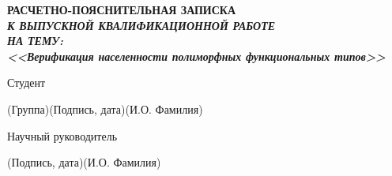 \documentclass[14pt, russian]{scrartcl}
\begin{document}
\sloppy
\setcounter{secnumdepth}{2}

\def\figurename{Рисунок}

\begin{titlepage}
\thispagestyle{empty}
\newpage

\bmstuheader
 
 
\vspace{3em}
 
\begin{center}
\Large \bf{РАСЧЕТНО-ПОЯСНИТЕЛЬНАЯ ЗАПИСКА\\\textbf{\textit{К ВЫПУСКНОЙ КВАЛИФИКАЦИОННОЙ РАБОТЕ\\НА ТЕМУ:}} \\}
{\large\bfseries\itshape <<Верификация населенности полиморфных функциональных типов>>}
\end{center}

\vspace{\fill}
 

\newlength{\ML}

\noindent Студент \underline{} \hfill \underline{ \hspace{4cm}}\quad
{}

\vspace{-2.1ex}
\noindent\hspace{9ex}\scriptsize{(Группа)}\normalsize\hspace{170pt}\hspace{2ex}\scriptsize{(Подпись, дата)}\normalsize\hspace{30pt}\hspace{6ex}\scriptsize{(И.О. Фамилия)}\normalsize

\bigskip

\noindent Научный руководитель  \hfill \underline{\hspace{4cm}}\quad
{}


\vspace{-2ex}
\noindent\hspace{13.5ex}\normalsize\hspace{170pt}\hspace{2ex}\scriptsize{(Подпись, дата)}\normalsize\hspace{30pt}\hspace{6ex}\scriptsize{(И.О. Фамилия)}\normalsize
\bigskip


\end{titlepage}
\end{document}
